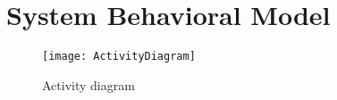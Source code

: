 \chapter{System Behavioral Model}

\begin{figure}[H]
\centering
\texttt{[image: ActivityDiagram]}
\caption{Activity diagram}
\label{fig:ActivityDiagram}
\end{figure}